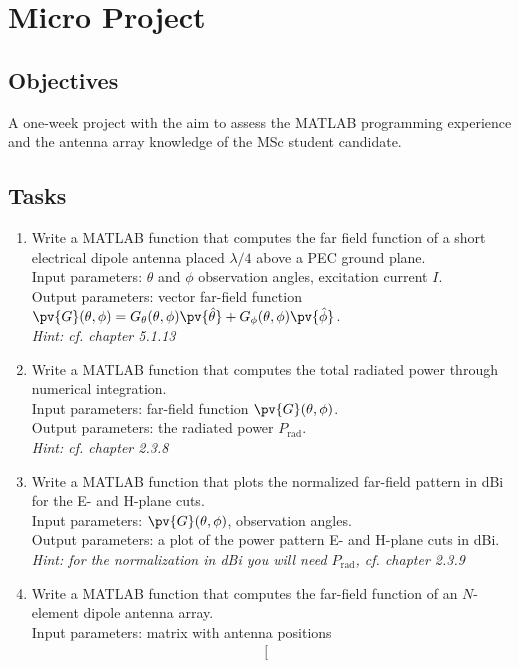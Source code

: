 \chapter{Micro Project}\label{Chap1}
\section{Objectives}
A one-week project with the aim to assess the MATLAB programming experience and the antenna array knowledge of the MSc student candidate.

\section{Tasks}
\begin{enumerate}
\item Write a MATLAB function that computes the far field function of a short electrical dipole antenna placed $\lambda/4$ above a PEC ground plane.
\\Input parameters: $\theta$ and $\phi$ observation angles, excitation current $I$.
\\Output parameters: vector far-field function $\pv{G}(\theta,\phi)=G_\theta(\theta,\phi)\pv{\hat{\theta}}+G_\phi(\theta,\phi)\pv{\hat{\phi}}$.
\\ \emph{Hint: cf. chapter 5.1.13}
\item Write a MATLAB function that computes the total radiated power through numerical integration.
\\Input parameters: far-field function $\pv{G}(\theta,\phi)$.
\\Output parameters: the radiated power $P_{\text{rad}}$.
\\\emph{Hint: cf. chapter 2.3.8}
\item Write a MATLAB function that plots the normalized far-field pattern in dBi for the E- and H-plane cuts.
\\Input parameters: $\pv{G}(\theta,\phi)$, observation angles.
\\Output parameters: a plot of the power pattern E- and H-plane cuts in dBi.
\\\emph{Hint: for the normalization in dBi you will need $P_{\text{rad}}$, cf. chapter 2.3.9}
\item Write a MATLAB function that computes the far-field function of an $N$-element dipole antenna array.
\\ Input parameters: matrix with antenna positions
\begin{align}
\left[
\begin{matrix}

\end{matrix}
\end{align}
\end{enumerate}
